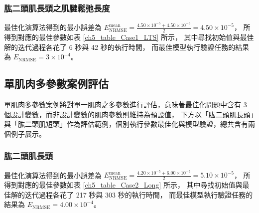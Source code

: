 \subsubsection{肱二頭肌長頭之肌腱鬆弛長度}
最佳化演算法得到的最小誤差為 $E^\mathrm{mean}_\mathrm{NRMSE} = \frac{4.50 \times 10^{-5} + 4.50 \times 10^{-5}}{2} = 4.50 \times 10^{-5}$，
所得到對應的最佳參數如表 \ref{ch5_table_Case1_LTS} 所示，
其中尋找初始值與最佳解的迭代過程各花了 6 秒與 42 秒的執行時間，
而最佳模型執行驗證任務的結果為 $E_\mathrm{NRMSE} = 3 \times 10^{-4}$。

\begin{table}[!ht]
    \caption[單肌肉單參數案例：肱二頭肌長頭之肌腱鬆弛長度的最佳參數]{單肌肉單參數案例於肱二頭肌長頭之肌腱鬆弛長度的最佳參數}
	\label{ch5_table_Case1_LTS}
	\centering
\end{table}

\subsection{單肌肉多參數案例評估}
單肌肉多參數案例將對單一肌肉之多參數進行評估，意味著最佳化問題中含有 3 個設計變數，而非設計變數的肌肉參數則維持為預設值，
下方以「肱二頭肌長頭」與「肱二頭肌短頭」作為評估範例，個別執行參數最佳化與模型驗證，總共含有兩個例子展示。

\subsubsection{肱二頭肌長頭}
最佳化演算法得到的最小誤差為 $E^\mathrm{mean}_\mathrm{NRMSE} = \frac{4.20 \times 10^{-5} + 6.00 \times 10^{-5}}{2} = 5.10 \times 10^{-5}$，
所得到對應的最佳參數如表 \ref{ch5_table_Case2_Long} 所示，
其中尋找初始值與最佳解的迭代過程各花了 217 秒與 303 秒的執行時間，
而最佳模型執行驗證任務的結果為 $E_\mathrm{NRMSE} = 4.00 \times 10^{-4}$。

\begin{table}[!ht]
    \caption[單肌肉多參數案例：肱二頭肌長頭的最佳參數]{單肌肉多參數案例於肱二頭肌長頭的最佳參數}
	\label{ch5_table_Case2_Long}
	\centering
\end{table}

